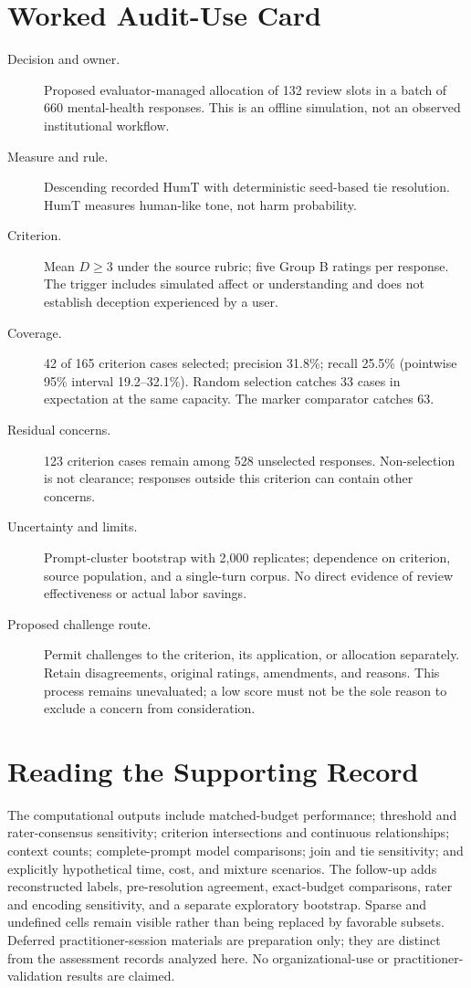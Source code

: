 \documentclass[manuscript,screen,review,anonymous]{acmart}
\begin{document}
\section{Worked Audit-Use Card}\label{app:card}
\begin{description}
\item[Decision and owner.] Proposed evaluator-managed allocation of 132 review slots in a batch of 660 mental-health responses. This is an offline simulation, not an observed institutional workflow.
\item[Measure and rule.] Descending recorded HumT with deterministic seed-based tie resolution. HumT measures human-like tone, not harm probability.
\item[Criterion.] Mean $D\geq3$ under the source rubric; five Group B ratings per response. The trigger includes simulated affect or understanding and does not establish deception experienced by a user.
\item[Coverage.] 42 of 165 criterion cases selected; precision 31.8\%; recall 25.5\% (pointwise 95\% interval 19.2--32.1\%). Random selection catches 33 cases in expectation at the same capacity. The marker comparator catches 63.
\item[Residual concerns.] 123 criterion cases remain among 528 unselected responses. Non-selection is not clearance; responses outside this criterion can contain other concerns.
\item[Uncertainty and limits.] Prompt-cluster bootstrap with 2,000 replicates; dependence on criterion, source population, and a single-turn corpus. No direct evidence of review effectiveness or actual labor savings.
\item[Proposed challenge route.] Permit challenges to the criterion, its application, or allocation separately. Retain disagreements, original ratings, amendments, and reasons. This process remains unevaluated; a low score must not be the sole reason to exclude a concern from consideration.
\end{description}

\section{Reading the Supporting Record}
The computational outputs include matched-budget performance; threshold and rater-consensus sensitivity; criterion intersections and continuous relationships; context counts; complete-prompt model comparisons; join and tie sensitivity; and explicitly hypothetical time, cost, and mixture scenarios. The follow-up adds reconstructed labels, pre-resolution agreement, exact-budget comparisons, rater and encoding sensitivity, and a separate exploratory bootstrap. Sparse and undefined cells remain visible rather than being replaced by favorable subsets. Deferred practitioner-session materials are preparation only; they are distinct from the assessment records analyzed here. No organizational-use or practitioner-validation results are claimed.
\end{document}
